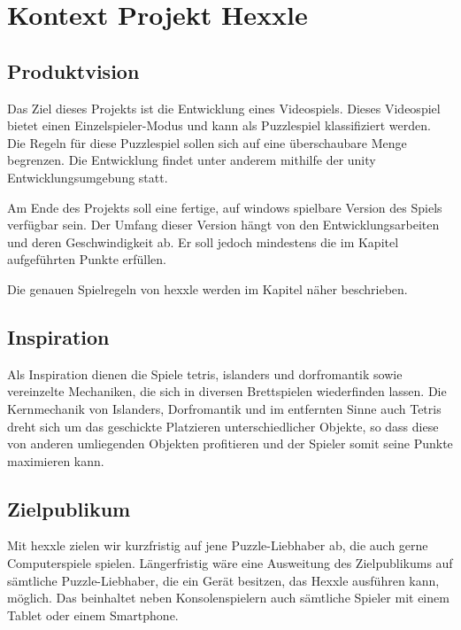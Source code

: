 \documentclass[../main.tex]{subfiles}
\begin{document}
	\section{Kontext Projekt Hexxle}
	\label{section:Kontext}
	
	\subsection{Produktvision}
	\par Das Ziel dieses Projekts ist die Entwicklung eines Videospiels. Dieses Videospiel bietet einen Einzelspieler-Modus und kann als Puzzlespiel klassifiziert werden. Die Regeln für diese Puzzlespiel sollen sich auf eine überschaubare Menge begrenzen. Die Entwicklung findet unter anderem mithilfe der \gls{unity} Entwicklungsumgebung statt.
	\par Am Ende des Projekts soll eine fertige, auf \gls{windows} spielbare Version des Spiels verfügbar sein. Der Umfang dieser Version hängt von den Entwicklungsarbeiten und deren Geschwindigkeit ab. Er soll jedoch mindestens die im Kapitel  aufgeführten Punkte erfüllen.
	\par Die genauen Spielregeln von \gls{hexxle} werden im Kapitel  näher beschrieben.
	
	\subsection{Inspiration}
	\par Als Inspiration dienen die Spiele \gls{tetris}, \gls{islanders} und \gls{dorfromantik} sowie vereinzelte Mechaniken, die sich in diversen Brettspielen wiederfinden lassen. Die Kernmechanik von Islanders, Dorfromantik und im entfernten Sinne auch Tetris dreht sich um das geschickte Platzieren unterschiedlicher Objekte, so dass diese von anderen umliegenden Objekten profitieren und der Spieler somit seine Punkte maximieren kann.

	\subsection{Zielpublikum}
	\par Mit \gls{hexxle} zielen wir kurzfristig auf jene Puzzle-Liebhaber ab, die auch gerne Computerspiele spielen. Längerfristig wäre eine Ausweitung des Zielpublikums auf sämtliche Puzzle-Liebhaber, die ein Gerät besitzen, das Hexxle ausführen kann, möglich. Das beinhaltet neben Konsolenspielern auch sämtliche Spieler mit einem Tablet oder einem Smartphone.
\end{document}
